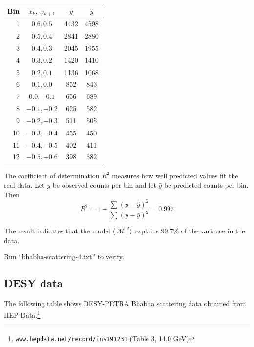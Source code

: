 \documentclass[12pt]{article}
\begin{document}
\noindent

\begin{center}
\begin{tabular}{|r|c|c|c|}
\hline
Bin & $x_k$, $x_{k+1}$ & $y$ & $\hat{y}$ \\
\hline
1 & $0.6, 0.5$ & 4432 & 4598\\
2 & $0.5, 0.4$ & 2841 & 2880\\
3 & $0.4, 0.3$ & 2045 & 1955\\
4 & $0.3, 0.2$ & 1420 & 1410\\
5 & $0.2, 0.1$ & 1136 & 1068\\
6 & $0.1, 0.0$ & 852 & 843\\
7 & $0.0, -0.1$ & 656 & 689\\
8 & $-0.1, -0.2$ & 625 & 582\\
9 & $-0.2, -0.3$ & 511 & 505\\
10 & $-0.3, -0.4$ & 455 & 450\\
11 & $-0.4, -0.5$ & 402 & 411\\
12 & $-0.5, -0.6$ & 398 & 382\\
\hline
\end{tabular}
\end{center}

\noindent
The coefficient of determination $R^2$ measures how well predicted values fit the real data.
Let $y$ be observed counts per bin and let $\hat{y}$ be predicted counts per bin.
Then
\begin{equation*}
R^2=1-\frac{\sum(y-\hat{y})^2}{\sum(y-\bar{y})^2}=0.997
\end{equation*}

\noindent
The result indicates that the model $\langle|\mathcal{M}|^2\rangle$ explains
99.7\% of the variance in the data.

\bigskip
\noindent
Run ``bhabha-scattering-4.txt'' to verify.

\subsection*{DESY data}
The following table shows DESY-PETRA Bhabha scattering data obtained from
HEP Data.\footnote{{\tt www.hepdata.net/record/ins191231} (Table 3, 14.0 GeV)}
\end{document}
